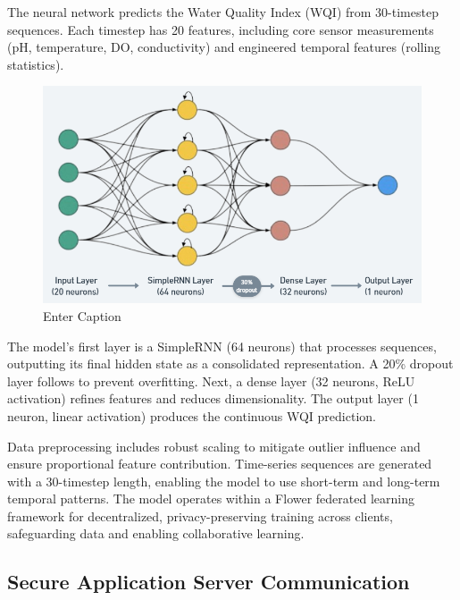 The neural network predicts the Water Quality Index (WQI) from 30-timestep sequences. Each timestep has 20 features, including core sensor measurements (pH, temperature, DO, conductivity) and engineered temporal features (rolling statistics).

\begin{figure}[H]
    \centering
    \includegraphics[width=0.75\linewidth]{Figures/RNN2.png} %
    \caption{Enter Caption}
    \label{fig:enter-label-rnn2} %
\end{figure}

The model's first layer is a SimpleRNN (64 neurons) that processes sequences, outputting its final hidden state as a consolidated representation. A 20\% dropout layer follows to prevent overfitting. Next, a dense layer (32 neurons, ReLU activation) refines features and reduces dimensionality. The output layer (1 neuron, linear activation) produces the continuous WQI prediction.

Data preprocessing includes robust scaling to mitigate outlier influence and ensure proportional feature contribution. Time-series sequences are generated with a 30-timestep length, enabling the model to use short-term and long-term temporal patterns. The model operates within a Flower federated learning framework for decentralized, privacy-preserving training across clients, safeguarding data and enabling collaborative learning.





\subsection{Secure Application Server Communication}

